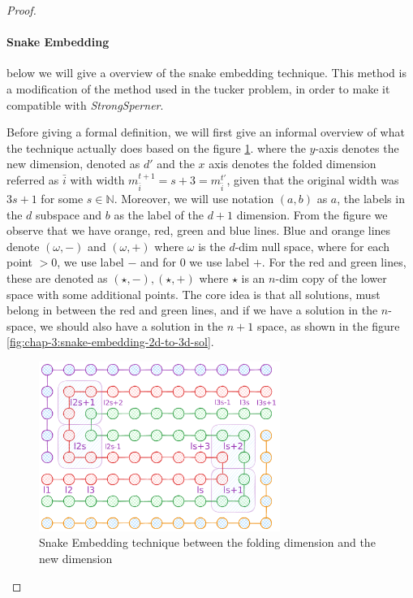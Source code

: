 \begin{proof}
    \paragraph{Snake Embedding} below we will give a overview of the snake embedding technique.
    This method is a modification of the method used in the tucker problem, in order to make it compatible with
    \textit{StrongSperner}.

    Before giving a formal definition, we will first give an informal overview of what
    the technique actually does based on the figure \ref{fig:chap-3:snake-embedding-visualisation-basic}.
    where the $y$-axis denotes the new dimension, denoted as $d'$ and the $x$ axis denotes the folded dimension
    referred as $\bar{i}$ with width $m_{\bar{i}}^{t+1} = s + 3 = m_{\bar{i}}^{t'}$,
    given that the original width was $3s+1$ for some $s \in \mathbb{N}$.
    Moreover, we will use notation $(a, b)$ as $a$, the labels in the
    $d$ subspace and $b$ as the label of the $d+1$ dimension.
    From the figure we observe that we have orange, red, green and blue lines.
    Blue and orange lines denote $(\omega, -)$ and $(\omega, +)$ where $\omega$
    is the $d$-dim null space, where for each point $>0$, we use label $-$ and for $0$
    we use label $+$. For the red and green lines,
    these are denoted as $(\star, -), (\star, +)$ where $\star$ is an $n$-dim copy of the lower
    space with some additional points. The core idea is that all solutions, must belong in between
    the red and green lines, and if we have a solution in the $n$-space, we should also have a
    solution in the $n+1$ space, as shown in the figure \ref{fig:chap-3:snake-embedding-2d-to-3d-sol}.


    \begin{figure}[h!]
        \centering
        \includegraphics[width=0.7\textwidth]{Chapter3/snake-embedding-simplified.pdf}
        \caption{Snake Embedding technique between the folding dimension and the new dimension}
        \label{fig:chap-3:snake-embedding-visualisation-basic}
    \end{figure}


\end{proof}
